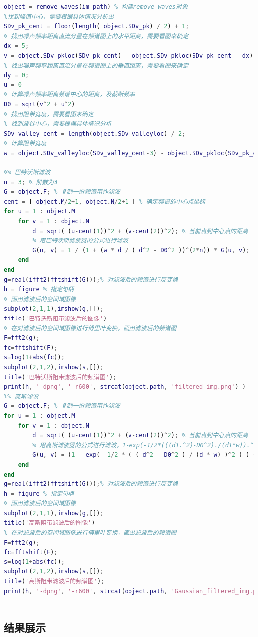 \documentclass[UTF8]{ctexart}
\begin{document}
    \begin{lstlisting}[language=Matlab,caption={$remove\_wave$}]
object = remove_waves(im_path) % 构建remove_waves对象
%找到峰值中心，需要根据具体情况分析出
SDv_pk_cent = floor(length( object.SDv_pk) / 2) + 1; 
% 找出噪声频率距离直流分量在频谱图上的水平距离，需要看图来确定
dx = 5;
v = object.SDv_pkloc(SDv_pk_cent) - object.SDv_pkloc(SDv_pk_cent - dx)
% 找出噪声频率距离直流分量在频谱图上的垂直距离，需要看图来确定
dy = 0;
u = 0
% 计算噪声频率距离频谱中心的距离，及截断频率
D0 = sqrt(v^2 + u^2)
% 找出阻带宽度，需要看图来确定
% 找到波谷中心，需要根据具体情况分析
SDv_valley_cent = length(object.SDv_valleyloc) / 2; 
% 计算阻带宽度
w = object.SDv_valleyloc(SDv_valley_cent-3) - object.SDv_pkloc(SDv_pk_cent - 6)

%% 巴特沃斯滤波
n = 3; % 阶数为3
G = object.F; % 复制一份频谱用作滤波
cent = [ object.M/2+1, object.N/2+1 ] % 确定频谱的中心点坐标
for u = 1 : object.M
    for v = 1 : object.N
        d = sqrt( (u-cent(1))^2 + (v-cent(2))^2); % 当前点到中心点的距离
        % 用巴特沃斯滤波器的公式进行滤波
        G(u, v) = 1 / (1 + (w * d / ( d^2 - D0^2 ))^(2*n)) * G(u, v); 
    end
end
g=real(ifft2(fftshift(G)));% 对滤波后的频谱进行反变换
h = figure % 指定句柄
% 画出滤波后的空间域图像
subplot(2,1,1),imshow(g,[]);
title('巴特沃斯阻带滤波后的图像')
% 在对滤波后的空间域图像进行傅里叶变换，画出滤波后的频谱图
F=fft2(g); 
fc=fftshift(F); 
s=log(1+abs(fc));      
subplot(2,1,2),imshow(s,[]); 
title('巴特沃斯阻带滤波后的频谱图');
print(h, '-dpng', '-r600', strcat(object.path, 'filtered_img.png') )
%% 高斯滤波
G = object.F; % 复制一份频谱用作滤波
for u = 1 : object.M
    for v = 1 : object.N
        d = sqrt( (u-cent(1))^2 + (v-cent(2))^2); % 当前点到中心点的距离
        % 用高斯滤波器的公式进行滤波，1-exp(-1/2*(((d1.^2)-D0^2)./(d1*w)).^2)
        G(u, v) = (1 - exp( -1/2 * ( ( d^2 - D0^2 ) / (d * w) )^2 ) ) * G(u, v); 
    end
end
g=real(ifft2(fftshift(G)));% 对滤波后的频谱进行反变换
h = figure % 指定句柄
% 画出滤波后的空间域图像
subplot(2,1,1),imshow(g,[]);
title('高斯阻带滤波后的图像')
% 在对滤波后的空间域图像进行傅里叶变换，画出滤波后的频谱图
F=fft2(g); 
fc=fftshift(F); 
s=log(1+abs(fc));      
subplot(2,1,2),imshow(s,[]); 
title('高斯阻带滤波后的频谱图');
print(h, '-dpng', '-r600', strcat(object.path, 'Gaussian_filtered_img.png') )
    
                  \end{lstlisting}
        \subsection{结果展示}
        
\end{document}
